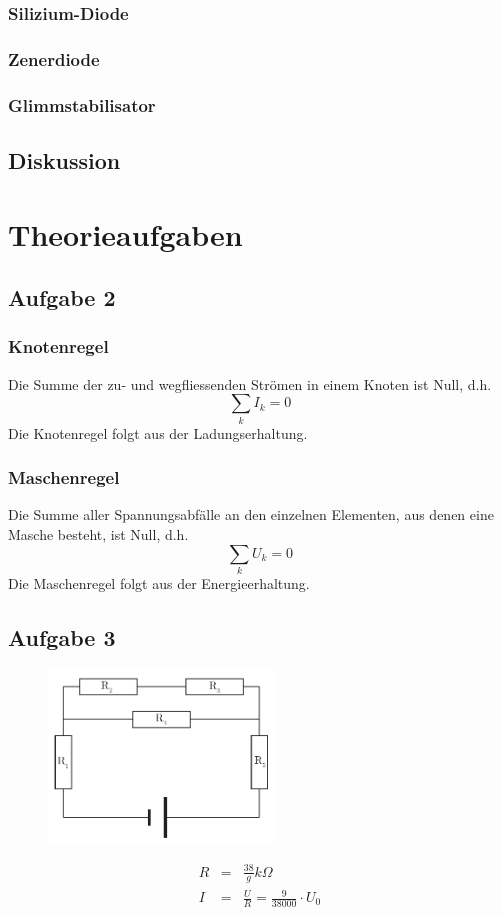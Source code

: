 \documentclass[12pt,a4paper]{article}
\begin{document}
\subsubsection*{Silizium-Diode}

\subsubsection*{Zenerdiode}

\subsubsection*{Glimmstabilisator}


\subsection*{Diskussion}

\newpage
\section*{Theorieaufgaben}

\subsection*{Aufgabe 2}
\subsubsection*{Knotenregel}
Die Summe der zu- und wegfliessenden Str\"omen in einem Knoten ist Null, d.h.
\[ \sum_kI_k = 0 \]
Die Knotenregel folgt aus der Ladungserhaltung.

\subsubsection*{Maschenregel}
Die Summe aller Spannungsabf\"alle an den einzelnen Elementen, aus denen eine Masche besteht, ist Null, d.h.
\[ \sum_kU_k = 0\]
Die Maschenregel folgt aus der Energieerhaltung.

\subsection*{Aufgabe 3}
\begin{figure}
\centering
\includegraphics[width=6cm]{exercise3.pdf}
\end{figure}
\begin{eqnarray*}
R & = & \frac{38}{g} k\Omega \\
I & = & \frac{U}{R} = \frac{9}{38000} \cdot U_0
\end{eqnarray*}
\end{document}
